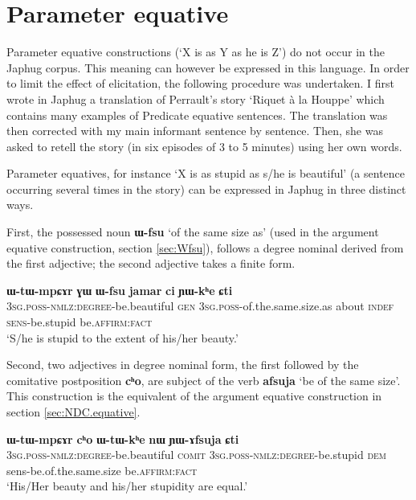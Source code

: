 \documentclass[oneside,a4paper,11pt]{article}
\newcommand{\ipa}[1]{{\phon\textbf{#1}}} %
\newcommand{\forme}[2]{\ipa{#1} `#2'}
\begin{document}
\section{Parameter equative} \label{sec:pred.equative}
Parameter equative constructions (`X is as Y as he is Z') do not occur in the Japhug corpus. This meaning can however be expressed in this language. In order to limit the effect of elicitation, the following procedure was undertaken. I first wrote in Japhug a translation of Perrault's story `Riquet à la Houppe' which contains many examples of Predicate equative sentences. The translation was then corrected with my main informant sentence by sentence. Then, she was asked to retell the story (in six episodes of 3 to 5 minutes) using her own words.

Parameter equatives, for instance `X is as stupid as s/he is beautiful' (a sentence occurring several times in the story) can be expressed in Japhug in three distinct ways.

First, the possessed noun \forme{ɯ-fsu}{of the same size as} (used in the argument equative construction, section \ref{sec:Wfsu}), follows a degree nominal derived from the first adjective; the second adjective takes a finite form.

\begin{exe}
\ex 
\gll 
\ipa{ɯ-tɯ-mpɕɤr} \ipa{ɣɯ} 	\ipa{ɯ-fsu} 	\ipa{jamar} 	\ipa{ci} 	\ipa{ɲɯ-kʰe} 	\ipa{ɕti} \\
\textsc{3sg.poss-nmlz:degree}-be.beautiful \textsc{gen} \textsc{3sg.poss}-of.the.same.size.as about \textsc{indef} \textsc{sens}-be.stupid be.\textsc{affirm:fact} \\
\glt `S/he is stupid to the extent of his/her beauty.'
\end{exe}

Second, two adjectives in degree nominal form, the first followed by the comitative postposition \ipa{cʰo}, are subject of the verb \forme{afsuja}{be of the same size}. This construction is the equivalent of the argument equative construction in section \ref{sec:NDC.equative}.

\begin{exe}
\ex \label{ex:YAfsuja}
\gll 
\ipa{ɯ-tɯ-mpɕɤr} 	\ipa{cʰo} 	\ipa{ɯ-tɯ-kʰe} 	\ipa{nɯ} 	\ipa{ɲɯ-ɤfsuja} 	\ipa{ɕti} \\
\textsc{3sg.poss-nmlz:degree}-be.beautiful \textsc{comit} \textsc{3sg.poss-nmlz:degree}-be.stupid \textsc{dem} sens-be.of.the.same.size be.\textsc{affirm:fact} \\
\glt `His/Her beauty and his/her stupidity are equal.'
\end{exe}
\end{document}
